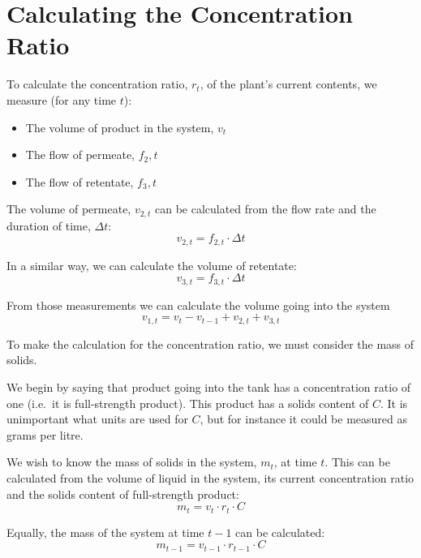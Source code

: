 \documentclass{article}
\begin{document}
\section*{Calculating the Concentration Ratio}

To calculate the concentration ratio, $r_t$, of the plant's current contents, we measure (for any time $t$):
\begin{itemize}
\item The volume of product in the system, $v_t$
\item The flow of permeate, $f_2,t$
\item The flow of retentate, $f_3,t$
\end{itemize}

The volume of permeate, $v_{2,t}$ can be calculated from the flow rate and the duration of time, $\Delta t$:
\begin{equation}
  v_{2,t} = f_{2,t} \cdot \Delta t
\end{equation}

In a similar way, we can calculate the volume of retentate:
\begin{equation}
  v_{3,t} = f_{3,t} \cdot \Delta t
\end{equation}


From those measurements we can calculate the volume going into the system
\begin{equation}
  v_{1,t} = v_{t} - v_{t-1} + v_{2,t} + v_{3,t}
  \label{eq:v1}
\end{equation}

To make the calculation for the concentration ratio, we must consider the mass of solids.

We begin by saying that product going into the tank has a concentration ratio of one (i.e.~it is full-strength product).  This product has a solids content of $C$.  It is unimportant what units are used for $C$, but for instance it could be measured as grams per litre.

We wish to know the mass of solids in the system, $m_t$, at time $t$.  This can be calculated from the volume of liquid in the system, its current concentration ratio and the solids content of full-strength product:
\begin{equation}
  m_t = v_t \cdot r_t \cdot C
\end{equation}

Equally, the mass of the system at time $t-1$ can be calculated:
\begin{equation}
  m_{t-1} = v_{t-1} \cdot r_{t-1} \cdot C
\end{equation}
\end{document}
